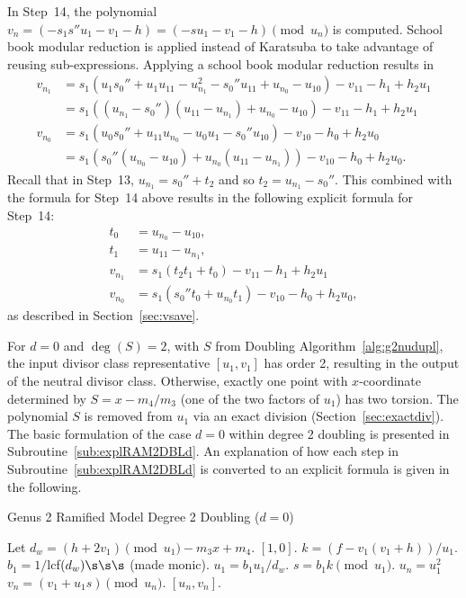 In Step~14, the polynomial $v_n = (-s_1s''u_1 - v_1 - h) = (-su_1 - v_1 - h)
\pmod{u_n}$ is computed. School book modular reduction is applied instead of
Karatsuba to take advantage of reusing sub-expressions. Applying a school book
modular reduction results in
\begin{align*}
    v_{n_1} &= s_1(u_1s_0''+ u_1u_{11} - u_{n_1}^2 - s_0''u_{11}
    + u_{n_0} - u_{10}) - v_{11} - h_1 + h_2u_1\\
            &= s_1((u_{n_1} - s_0'')(u_{11} - u_{n_1}) + u_{n_0} - u_{10}) - v_{11} - h_1 + h_2u_1\\
    v_{n_0} &= s_1(u_0s_0'' + u_{11}u_{n_0} - u_0u_1 -s_0''u_{10}) - v_{10} - h_0 + h_2u_0\\
            &= s_1(s_0''(u_{n_0} - u_{10}) + u_{n_0}(u_{11} - u_{n_1})) - v_{10} - h_0 + h_2u_0.
\end{align*} 
Recall that in Step~13, $u_{n_1} = s_0'' + t_2$ and so $t_2 = u_{n_1} - s_0''$.
This combined with the formula for Step~14 above results in the following
explicit formula for Step~14: 
\begin{align*}  
    t_0 &= u_{n_0} - u_{10},\\
    t_1 &= u_{11} - u_{n_1},\\
    v_{n_1} &= s_1(t_2t_1 + t_0) - v_{11} - h_1 + h_2u_1\\
    v_{n_0} &= s_1(s_0''t_0 + u_{n_0}t_1) - v_{10} - h_0 + h_2u_0,
\end{align*}
as described in Section~\ref{sec:vsave}. 

For $d=0$ and $\deg(S) = 2$, with $S$ from Doubling
Algorithm~\ref{alg:g2nudupl}, the input divisor class representative $[u_1,v_1]$
has order 2, resulting in the output of the neutral divisor class. Otherwise,
exactly one point with $x$-coordinate determined by $S = x - m_4/m_3$ (one of the two factors of
$u_1$) has two torsion. The polynomial $S$ is removed from $u_1$ via an exact
division (Section~\ref{sec:exactdiv}). The basic formulation of the case $d = 0$
within degree 2 doubling is presented in Subroutine~\ref{sub:explRAM2DBLd}. An
explanation of how each step in Subroutine~\ref{sub:explRAM2DBLd} is converted
to an explicit formula is given in the following. 

\begin{subroutine}[htbp]
\caption{Genus 2 Ramified Model Degree 2 Doubling ($d = 0$) \label{sub:explRAM2DBLd}}
\begin{algorithmic}[1]
\State Let $d_w = (h + 2v_1) \pmod{u_1} -m_3x + m_4.$
 \hspace{1pt} \Return $[1,0]$.
\EndIf
\State $k = (f - v_1(v_1 + h))/u_1$.
\State $b_1 = 1/$lcf$(d_w) \s\s\s$ (made monic).
\State $u_1 = b_1u_1/d_w$.
\State $s = b_1k \pmod{u_1}$.
\State $u_n = u_1^2$
\State $v_n = (v_1 + u_1s) \pmod{u_n}$.
\State \Return $[u_n,v_n]$.
\end{algorithmic}
\end{subroutine}


